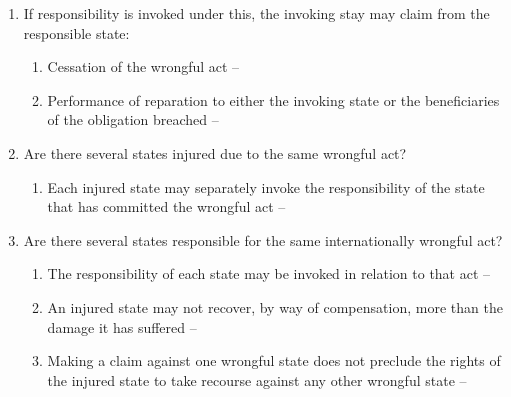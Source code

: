 \begin{enumerate}
\begin{enumerate}
\begin{enumerate}
\begin{enumerate}
            \end{enumerate}
            \item If responsibility is invoked under this, the invoking stay may claim from the responsible state:
            \begin{enumerate}
                \item Cessation of the wrongful act -- 
                \item Performance of reparation to either the invoking state or the beneficiaries of the obligation breached -- 
            \end{enumerate}
            \item Are there several states injured due to the same wrongful act?
            \begin{enumerate}
                \item Each injured state may separately invoke the responsibility of the state that has committed the wrongful act -- 
            \end{enumerate}
            \item Are there several states responsible for the same internationally wrongful act?
            \begin{enumerate}
                \item The responsibility of each state may be invoked in relation to that act -- 
                \item An injured state may not recover, by way of compensation, more than the damage it has suffered -- 
                \item Making a claim against one wrongful state does not preclude the rights of the injured state to take recourse against any other wrongful state -- 
            \end{enumerate}
        \end{enumerate}
    \end{enumerate}

\end{enumerate}
